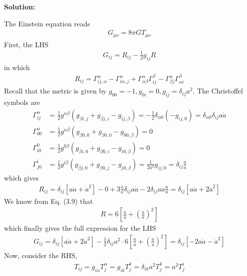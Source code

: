 \documentclass[11pt]{article}
\begin{document}
\textbf{Solution:}

The Einstein equation reads 
\begin{align*}
    G_{\mu\nu} = 8\pi G T_{\mu\nu}
\end{align*}
First, the LHS
\begin{align*}
    G_{ij} = R_{ij} - \frac{1}{2}g_{ij}R 
\end{align*}
in which 
\begin{align*}
    R_{ij} = \Gamma^\alpha_{ij, \alpha} - \Gamma^\alpha_{i\alpha, j} + \Gamma^\alpha_{\alpha\beta}\Gamma^\beta_{ij} - \Gamma^\alpha_{\beta j}\Gamma^\beta_{\alpha i}
\end{align*}
Recall that the metric is given by $g_{00} = -1, g_{0i} = 0, g_{ij} = \delta_{ij} a^2$. The Christoffel symbols are 
\begin{align*}
    \Gamma^\alpha_{ij} &= \frac{1}{2}g^{\alpha\beta}(g_{\beta i,j} + g_{\beta j, i} - g_{ij, \beta}) = -\frac{1}{2}\delta_{\alpha 0}(-g_{ij, 0}) = \delta_{\alpha 0} \delta_{ij}a\dot{a}\\
    \Gamma^\alpha_{00} &= \frac{1}{2}g^{\alpha \beta} (g_{\beta 0, 0} + g_{\beta 0,0} - g_{00, \beta}) = 0 \\
    \Gamma^0_{i0} &= \frac{1}{2}g^{0\beta}( g_{\beta i, 0} + g_{\beta 0, i} - g_{i0, \beta}) = 0 \\
    \Gamma^i_{j0} &= \frac{1}{2}g^{i\beta} (g_{\beta j, 0} + g_{\beta 0, j} - g_{j0, \beta}) = \frac{1}{2a^2}g_{ij, 0} = \delta_{ij} \frac{\dot{a}}{a}
\end{align*}
which gives 
\begin{align*}
    R_{ij} = \delta_{ij} [a\ddot{a} + \dot{a}^2] - 0 + 3\frac{\dot{a}}{a}\delta_{ij}a\dot{a} - 2\delta_{ij}a\dot{a}\frac{\dot{a}}{a} = \delta_{ij} [a\ddot{a} + 2\dot{a}^2]
\end{align*}
We know from Eq. (3.9) that 
\begin{align*}
    R = 6 \left[ \frac{\ddot{a}}{a} + \left(\frac{\dot{a}}{a}\right)^2\right] 
\end{align*}
which finally gives the full expression for the LHS
\begin{align*}
    G_{ij} = \delta_{ij} [a\ddot{a} + 2\dot{a}^2] - \frac{1}{2}\delta_{ij}a^2\cdot 6 \left[ \frac{\ddot{a}}{a} + \left(\frac{\dot{a}}{a}\right)^2\right] = \delta_{ij} [-2a\ddot{a} - \dot{a}^2 ]
\end{align*}
Now, consider the RHS, 
\begin{align*}
    T_{ij} = g_{i\alpha}T^\alpha_j = g_{ik}T^k_j = \delta_{ik}a^2 T^k_j = a^2 T^i_j 
\end{align*}
\end{document}
